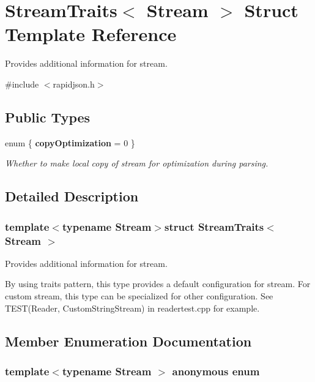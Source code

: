 \hypertarget{struct_stream_traits}{}\section{Stream\+Traits$<$ Stream $>$ Struct Template Reference}
\label{struct_stream_traits}


Provides additional information for stream.  




{\ttfamily \#include $<$rapidjson.\+h$>$}

\subsection*{Public Types}
\begin{DoxyCompactItemize}
\item 
enum \{ {\bfseries copy\+Optimization} = 0
 \}
\begin{DoxyCompactList}\small\item\em Whether to make local copy of stream for optimization during parsing. \end{DoxyCompactList}\end{DoxyCompactItemize}


\subsection{Detailed Description}
\subsubsection*{template$<$typename Stream$>$struct Stream\+Traits$<$ Stream $>$}

Provides additional information for stream. 

By using traits pattern, this type provides a default configuration for stream. For custom stream, this type can be specialized for other configuration. See T\+E\+S\+T(\+Reader, Custom\+String\+Stream) in readertest.\+cpp for example. 

\subsection{Member Enumeration Documentation}
\hypertarget{struct_stream_traits_a396e8fd5cbb7c0a9e4c1f509e4d490f5}{}\subsubsection[{anonymous enum}]{\setlength{\rightskip}{0pt plus 5cm}template$<$typename Stream $>$ anonymous enum}\label{struct_stream_traits_a396e8fd5cbb7c0a9e4c1f509e4d490f5}



